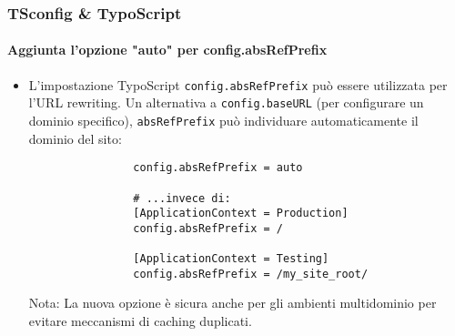 \begin{frame}[fragile]
	\frametitle{TSconfig \& TypoScript}
	\framesubtitle{Aggiunta l'opzione "auto" per config.absRefPrefix}

	\begin{itemize}
		\item L'impostazione TypoScript \texttt{config.absRefPrefix} può essere utilizzata per l'URL
			rewriting. Un alternativa a \texttt{config.baseURL} (per configurare un dominio specifico), 
			\texttt{absRefPrefix} può individuare automaticamente il dominio del sito:

			\begin{lstlisting}
				config.absRefPrefix = auto

				# ...invece di:
				[ApplicationContext = Production]
				config.absRefPrefix = /

				[ApplicationContext = Testing]
				config.absRefPrefix = /my_site_root/
			\end{lstlisting}

		\smaller
			Nota: La nuova opzione è sicura anche per gli ambienti multidominio per evitare
			meccanismi di caching duplicati.
		\normalsize

	\end{itemize}

\end{frame}


